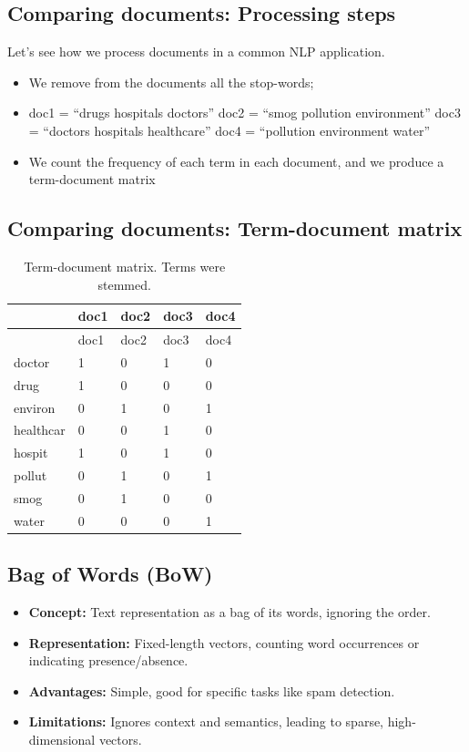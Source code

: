 \documentclass[
  letterpaper,
  DIV=11,
  numbers=noendperiod]{scrartcl}
\providecommand{\tightlist}{%
  \setlength{\itemsep}{0pt}\setlength{\parskip}{0pt}}
\begin{document}
\subsection{Comparing documents: Processing
steps}\label{comparing-documents-processing-steps}

Let's see how we process documents in a common NLP application.

\begin{itemize}
\item
  We remove from the documents all the stop-words;
\item
  doc1 = ``drugs hospitals doctors'' doc2 = ``smog pollution
  environment'' doc3 = ``doctors hospitals healthcare'' doc4 =
  ``pollution environment water''
\item
  We count the frequency of each term in each document, and we produce a
  term-document matrix
\end{itemize}

\subsection{Comparing documents: Term-document
matrix}\label{comparing-documents-term-document-matrix}

\begin{longtable}[]{@{}lllll@{}}
\caption{Term-document matrix. Terms were stemmed.}\tabularnewline
\toprule\noalign{}
& doc1 & doc2 & doc3 & doc4 \\
\midrule\noalign{}
\endfirsthead
\toprule\noalign{}
& doc1 & doc2 & doc3 & doc4 \\
\midrule\noalign{}
\endhead
\bottomrule\noalign{}
\endlastfoot
doctor & 1 & 0 & 1 & 0 \\
drug & 1 & 0 & 0 & 0 \\
environ & 0 & 1 & 0 & 1 \\
healthcar & 0 & 0 & 1 & 0 \\
hospit & 1 & 0 & 1 & 0 \\
pollut & 0 & 1 & 0 & 1 \\
smog & 0 & 1 & 0 & 0 \\
water & 0 & 0 & 0 & 1 \\
\end{longtable}

\subsection{Bag of Words (BoW)}\label{bag-of-words-bow}

\begin{itemize}
\tightlist
\item
  \textbf{Concept:} Text representation as a bag of its words, ignoring
  the order.
\item
  \textbf{Representation:} Fixed-length vectors, counting word
  occurrences or indicating presence/absence.
\item
  \textbf{Advantages:} Simple, good for specific tasks like spam
  detection.
\item
  \textbf{Limitations:} Ignores context and semantics, leading to
  sparse, high-dimensional vectors.
\end{itemize}
\end{document}
